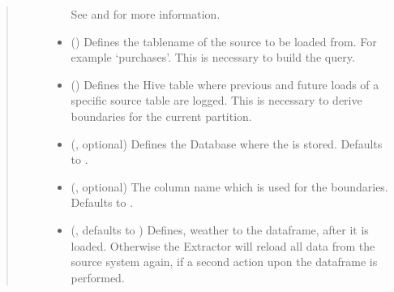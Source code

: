 \documentclass[a4paper,10pt, twoside,english]{sphinxmanual}
\begin{document}
\begin{fulllineitems}
\begin{quote}
\begin{description}
\begin{itemize}
\begin{description}
\begin{itemize}
\end{itemize}

\end{description}

See  and
 for more information.


\item {} 
 () \textendash{} Defines the tablename of the source to be loaded from. For example ‘purchases’.
This is necessary to build the query.

\item {} 
 () \textendash{} Defines the Hive table where previous and future loads of a specific source table
are logged. This is necessary to derive boundaries for the current partition.

\item {} 
 (, optional) \textendash{} Defines the Database where the  is stored.
Defaults to .

\item {} 
 (, optional) \textendash{} The column name which is used for the boundaries.
Defaults to .

\item {} 
 (, defaults to ) \textendash{} Defines, weather to  the dataframe, after it is loaded. Otherwise the Extractor
will reload all data from the source system again, if a second action upon the dataframe
is performed.


\end{itemize}
\end{description}
\end{quote}
\end{fulllineitems}
\end{document}
